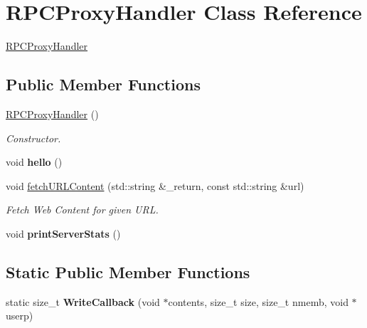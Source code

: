 \hypertarget{classRPCProxyHandler}{\section{\-R\-P\-C\-Proxy\-Handler \-Class \-Reference}
\label{classRPCProxyHandler}
}



\begin{DoxyItemize}
\item \hyperlink{classRPCProxyHandler}{\-R\-P\-C\-Proxy\-Handler} 
\end{DoxyItemize} 


\subsection*{\-Public \-Member \-Functions}
\begin{DoxyCompactItemize}
\item 
\hypertarget{classRPCProxyHandler_a410b74fb33e3d8f86c6ef441eb3e941f}{\hyperlink{classRPCProxyHandler_a410b74fb33e3d8f86c6ef441eb3e941f}{\-R\-P\-C\-Proxy\-Handler} ()}\label{classRPCProxyHandler_a410b74fb33e3d8f86c6ef441eb3e941f}

\begin{DoxyCompactList}\small\item\em \-Constructor. \end{DoxyCompactList}\item 
\hypertarget{classRPCProxyHandler_a13211f85624d234a58ece66412f845ab}{void {\bfseries hello} ()}\label{classRPCProxyHandler_a13211f85624d234a58ece66412f845ab}

\item 
void \hyperlink{classRPCProxyHandler_a4b821c2866975f9d686e830df86095a4}{fetch\-U\-R\-L\-Content} (std\-::string \&\-\_\-return, const std\-::string \&url)
\begin{DoxyCompactList}\small\item\em \-Fetch \-Web \-Content for given \-U\-R\-L. \end{DoxyCompactList}\item 
\hypertarget{classRPCProxyHandler_ab02e49e5ab6b7c8e83ff3c411a5ff0f4}{void {\bfseries print\-Server\-Stats} ()}\label{classRPCProxyHandler_ab02e49e5ab6b7c8e83ff3c411a5ff0f4}

\end{DoxyCompactItemize}
\subsection*{\-Static \-Public \-Member \-Functions}
\begin{DoxyCompactItemize}
\item 
\hypertarget{classRPCProxyHandler_a4502c256cc2202280a3626080d2cc3ab}{static size\-\_\-t {\bfseries \-Write\-Callback} (void $\ast$contents, size\-\_\-t size, size\-\_\-t nmemb, void $\ast$userp)}\label{classRPCProxyHandler_a4502c256cc2202280a3626080d2cc3ab}

\end{DoxyCompactItemize}
